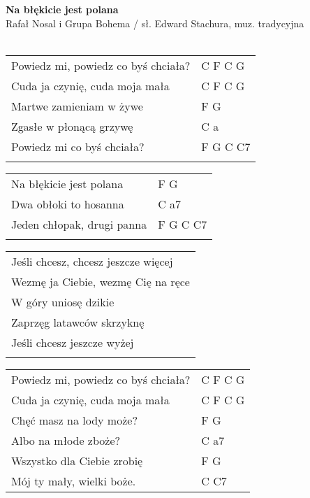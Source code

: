 \documentclass[a5paper]{article}
\begin{document}


\noindent
\fontsize{12pt}{15pt}\selectfont
\textbf{Na błękicie jest polana} \\
\fontsize{8pt}{10pt}\selectfont
Rafał Nosal i Grupa Bohema / sł. Edward Stachura, muz. tradycyjna \\ \\
\fontsize{10pt}{12pt}\selectfont
{}
\begin{tabular}{@{}p{7.50cm}p{3cm}@{}}
\noindent
Powiedz mi, powiedz co byś chciała? & C F C G \\
Cuda ja czynię, cuda moja mała & C F C G \\
Martwe zamieniam w żywe & F G \\
Zgasłe w płonącą grzywę & C a \\
Powiedz mi co byś chciała? & F G C C7 \\ \\
\end{tabular}

\noindent
\begin{tabular}{@{}p{6.50cm}p{3cm}@{}}
Na błękicie jest polana & F G \\
Dwa obłoki to hosanna & C a7 \\
Jeden chłopak, drugi panna & F G C C7 \\ \\
\end{tabular}

\noindent
\begin{tabular}{@{}p{7.50cm}@{}}
Jeśli chcesz, chcesz jeszcze więcej \\
Wezmę ja Ciebie, wezmę Cię na ręce \\
W góry uniosę dzikie \\
Zaprzęg latawców skrzyknę \\
Jeśli chcesz jeszcze wyżej \\ \\
\end{tabular}

\noindent
\begin{tabular}{@{}p{7.50cm}p{3cm}@{}}
	Powiedz mi, powiedz co byś chciała? & C F C G \\
	Cuda ja czynię, cuda moja mała & C F C G \\
	Chęć masz na lody może? & F G \\
	Albo na młode zboże? & C a7 \\
	Wszystko dla Ciebie zrobię & F G \\
	Mój ty mały, wielki boże. & C C7 
\end{tabular}
\end{document}
